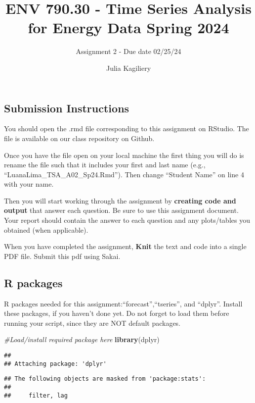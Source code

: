 \documentclass[
]{article}
\title{ENV 790.30 - Time Series Analysis for Energy Data \textbar{}
Spring 2024}
\subtitle{Assignment 2 - Due date 02/25/24}
\author{Julia Kagiliery}
\date{}
\newenvironment{Shaded}{\begin{snugshade}}{\end{snugshade}}
\newcommand{\CommentTok}[1]{\textcolor[rgb]{0.56,0.35,0.01}{\textit{#1}}}
\newcommand{\FunctionTok}[1]{\textcolor[rgb]{0.13,0.29,0.53}{\textbf{#1}}}
\newcommand{\NormalTok}[1]{#1}
\begin{document}
\maketitle

\hypertarget{submission-instructions}{%
\subsection{Submission Instructions}\label{submission-instructions}}

You should open the .rmd file corresponding to this assignment on
RStudio. The file is available on our class repository on Github.

Once you have the file open on your local machine the first thing you
will do is rename the file such that it includes your first and last
name (e.g., ``LuanaLima\_TSA\_A02\_Sp24.Rmd''). Then change ``Student
Name'' on line 4 with your name.

Then you will start working through the assignment by \textbf{creating
code and output} that answer each question. Be sure to use this
assignment document. Your report should contain the answer to each
question and any plots/tables you obtained (when applicable).

When you have completed the assignment, \textbf{Knit} the text and code
into a single PDF file. Submit this pdf using Sakai.

\hypertarget{r-packages}{%
\subsection{R packages}\label{r-packages}}

R packages needed for this assignment:``forecast'',``tseries'', and
``dplyr''. Install these packages, if you haven't done yet. Do not
forget to load them before running your script, since they are NOT
default packages.

\begin{Shaded}
\begin{Highlighting}[]
\CommentTok{\#Load/install required package here}
\FunctionTok{library}\NormalTok{(dplyr)}
\end{Highlighting}
\end{Shaded}

\begin{verbatim}
## 
## Attaching package: 'dplyr'
\end{verbatim}

\begin{verbatim}
## The following objects are masked from 'package:stats':
## 
##     filter, lag
\end{verbatim}
\end{document}
